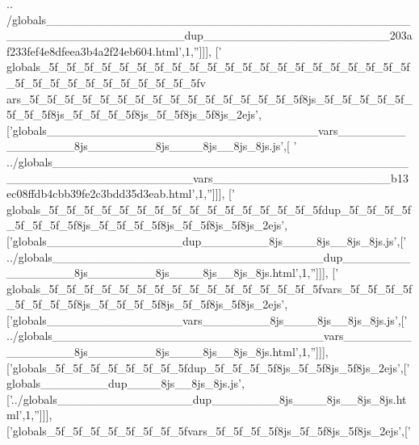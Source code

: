 \begin{DoxyCode}
{      ..
      /globals\_\_\_\_\_\_\_\_\_\_\_\_\_\_\_\_\_\_\_\_\_\_\_\_\_\_\_\_\_\_\_\_\_\_\_\_\_\_\_\_\_\_\_\_\_\_\_\_\_\_\_\_\_\_\_\_\_\_\_\_\_\_\_\_dup\_\_\_\_\_\_\_\_\_\_\_\_\_\_\_\_\_\_\_\_\_\_203af233fef4e8dfeea3b4a2f24eb604.html'},1,\textcolor{stringliteral}{''}]]],
  [\textcolor{stringliteral}{'
      globals\_5f\_5f\_5f\_5f\_5f\_5f\_5f\_5f\_5f\_5f\_5f\_5f\_5f\_5f\_5f\_5f\_5f\_5f\_5f\_5f\_5f\_5f\_5f\_5f\_5f\_5f\_5f\_5f\_5f\_5f\_5f\_5fv
      ars\_5f\_5f\_5f\_5f\_5f\_5f\_5f\_5f\_5f\_5f\_5f\_5f\_5f\_5f\_5f\_5f8js\_5f\_5f\_5f\_5f\_5f\_5f\_5f\_5f8js\_5f\_5f\_5f\_5f8js\_5f\_5f8js\_5f8js\_2ejs'},[\textcolor{stringliteral}{'globals\_\_\_\_\_\_\_\_\_\_\_\_\_\_\_\_\_\_\_\_\_\_\_\_\_\_\_\_\_\_\_\_vars\_\_\_\_\_\_\_\_\_\_\_\_\_\_\_\_8js\_\_\_\_\_\_\_\_8js\_\_\_\_8js\_\_8js\_8js.js'},[\textcolor{stringliteral}{
      '
      ../globals\_\_\_\_\_\_\_\_\_\_\_\_\_\_\_\_\_\_\_\_\_\_\_\_\_\_\_\_\_\_\_\_\_\_\_\_\_\_\_\_\_\_\_\_\_\_\_\_\_\_\_\_\_\_\_\_\_\_\_\_\_\_\_\_vars\_\_\_\_\_\_\_\_\_\_\_\_\_\_\_\_\_\_\_\_\_b13ec08ffdb4cbb39fe2c3bdd35d3eab.html'},1,\textcolor{stringliteral}{''}]]],
  [\textcolor{stringliteral}{'
      globals\_5f\_5f\_5f\_5f\_5f\_5f\_5f\_5f\_5f\_5f\_5f\_5f\_5f\_5f\_5f\_5fdup\_5f\_5f\_5f\_5f\_5f\_5f\_5f\_5f8js\_5f\_5f\_5f\_5f8js\_5f\_5f8js\_5f8js\_2ejs'},[\textcolor{stringliteral}{'globals\_\_\_\_\_\_\_\_\_\_\_\_\_\_\_\_dup\_\_\_\_\_\_\_\_8js\_\_\_\_8js\_\_8js\_8js.js'},[\textcolor{stringliteral}{'
      ../globals\_\_\_\_\_\_\_\_\_\_\_\_\_\_\_\_\_\_\_\_\_\_\_\_\_\_\_\_\_\_\_\_dup\_\_\_\_\_\_\_\_\_\_\_\_\_\_\_\_8js\_\_\_\_\_\_\_\_8js\_\_\_\_8js\_\_8js\_8js.html'},1,\textcolor{stringliteral}{''}]]],
  [\textcolor{stringliteral}{'
      globals\_5f\_5f\_5f\_5f\_5f\_5f\_5f\_5f\_5f\_5f\_5f\_5f\_5f\_5f\_5f\_5fvars\_5f\_5f\_5f\_5f\_5f\_5f\_5f\_5f8js\_5f\_5f\_5f\_5f8js\_5f\_5f8js\_5f8js\_2ejs'},[\textcolor{stringliteral}{'globals\_\_\_\_\_\_\_\_\_\_\_\_\_\_\_\_vars\_\_\_\_\_\_\_\_8js\_\_\_\_8js\_\_8js\_8js.js'},[\textcolor{stringliteral}{'
      ../globals\_\_\_\_\_\_\_\_\_\_\_\_\_\_\_\_\_\_\_\_\_\_\_\_\_\_\_\_\_\_\_\_vars\_\_\_\_\_\_\_\_\_\_\_\_\_\_\_\_8js\_\_\_\_\_\_\_\_8js\_\_\_\_8js\_\_8js\_8js.html'},1,\textcolor{stringliteral}{''}]]],
  [\textcolor{stringliteral}{'globals\_5f\_5f\_5f\_5f\_5f\_5f\_5f\_5fdup\_5f\_5f\_5f\_5f8js\_5f\_5f8js\_5f8js\_2ejs'},[\textcolor{stringliteral}{'
      globals\_\_\_\_\_\_\_\_dup\_\_\_\_8js\_\_8js\_8js.js'},[\textcolor{stringliteral}{'../globals\_\_\_\_\_\_\_\_\_\_\_\_\_\_\_\_dup\_\_\_\_\_\_\_\_8js\_\_\_\_8js\_\_8js\_8js.html'},1,\textcolor{stringliteral}{''}]]],
  [\textcolor{stringliteral}{'globals\_5f\_5f\_5f\_5f\_5f\_5f\_5f\_5fvars\_5f\_5f\_5f\_5f8js\_5f\_5f8js\_5f8js\_2ejs'},[\textcolor{stringliteral}{'
}
\end{DoxyCode}

